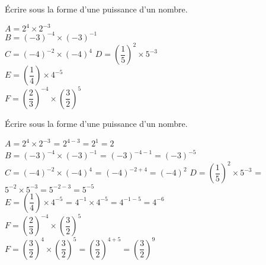 \begin{exercice*}    
    Écrire sous la forme d'une puissance d'un nombre.
    \begin{multicols}{2}
        \begin{spacing}{2}
            $A=2^4\times 2^{-3}$\\
            $B=(-3)^{-4}\times (-3)^{-1}$\\
            $C=(-4)^{-2}\times (-4)^4$
            \columnbreak
            $D=\left(\dfrac{1}{5}\right)^2\times 5^{-3}$\\
            $E=\left(\dfrac{1}{4}\right)\times 4^{-5}$\\
            $F=\left(\dfrac{2}{3}\right)^{-4}\times \left(\dfrac{3}{2}\right)^5$
        \end{spacing}
    \end{multicols}
\end{exercice*}
\begin{corrige}
    Écrire sous la forme d'une puissance d'un nombre.
        \begin{spacing}{2}
            $A=2^4\times 2^{-3}$                                                   {\red = $2^{4-3}=2^1=2$} \\
            $B=(-3)^{-4}\times (-3)^{-1}$                                          {\red = $(-3)^{-4-1}=(-3)^{-5}$} \\
            $C=(-4)^{-2}\times (-4)^4$                                             {\red = $(-4)^{-2+4}=(-4)^2$}                                                                        
            $D=\left(\dfrac{1}{5}\right)^2\times 5^{-3}$                           {\red = $5^{-2}\times 5^{-3}=5^{-2-3}=5^{-5}$}  \\
            $E=\left(\dfrac{1}{4}\right)\times 4^{-5}$                             {\red = $4^{-1}\times 4^{-5}=4^{-1-5}=4^{-6}$}  \\
            $F=\left(\dfrac{2}{3}\right)^{-4}\times \left(\dfrac{3}{2}\right)^5$   \\
            {\red $F=\left(\dfrac{3}{2}\right)^4\times \left(\dfrac{3}{2}\right)^5=\left(\dfrac{3}{2}\right)^{4+5}=\left(\dfrac{3}{2}\right)^9$}  
        \end{spacing}
\end{corrige}



